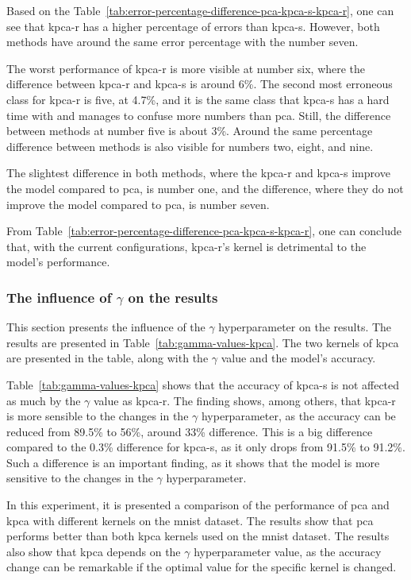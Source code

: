 Based on the Table~\ref{tab:error-percentage-difference-pca-kpca-s-kpca-r}, one can see that \gls{kpca-r} has a higher percentage of errors than \gls{kpca-s}. However, both methods have around the same error percentage with the number seven. 

The worst performance of \gls{kpca-r} is more visible at number six, where the difference between \gls{kpca-r} and \gls{kpca-s} is around 6\%. The second most erroneous class for \gls{kpca-r} is five, at 4.7\%, and it is the same class that \gls{kpca-s} has a hard time with and manages to confuse more numbers than \gls{pca}. Still, the difference between methods at number five is about 3\%. Around the same percentage difference between methods is also visible for numbers two, eight, and nine.

The slightest difference in both methods, where the \gls{kpca-r} and \gls{kpca-s} improve the model compared to \gls{pca}, is number one, and the difference, where they do not improve the model compared to \gls{pca}, is number seven.

From Table~\ref{tab:error-percentage-difference-pca-kpca-s-kpca-r}, one can conclude that, with the current configurations, \gls{kpca-r}'s kernel is detrimental to the model's performance.

\subsubsection{The influence of $\gamma$ on the results}\label{subsubsec:gamma-influence}
This section presents the influence of the $\gamma$ hyperparameter on the results. The results are presented in Table~\ref{tab:gamma-values-kpca}. The two kernels of \gls{kpca} are presented in the table, along with the $\gamma$ value and the model's accuracy.



Table~\ref{tab:gamma-values-kpca} shows that the accuracy of \gls{kpca-s} is not affected as much by the $\gamma$ value as \gls{kpca-r}. The finding shows, among others, that \gls{kpca-r} is more sensible to the changes in the $\gamma$ hyperparameter, as the accuracy can be reduced from 89.5\% to 56\%, around 33\% difference. This is a big difference compared to the 0.3\% difference for \gls{kpca-s}, as it only drops from 91.5\% to 91.2\%. Such a difference is an important finding, as it shows that the model is more sensitive to the changes in the $\gamma$ hyperparameter. 

In this experiment, it is presented a comparison of the performance of \gls{pca} and \gls{kpca} with different kernels on the \gls{mnist} dataset. The results show that \gls{pca} performs better than both \gls{kpca} kernels used on the \gls{mnist} dataset. The results also show that \gls{kpca} depends on the $\gamma$ hyperparameter value, as the accuracy change can be remarkable if the optimal value for the specific kernel is changed.